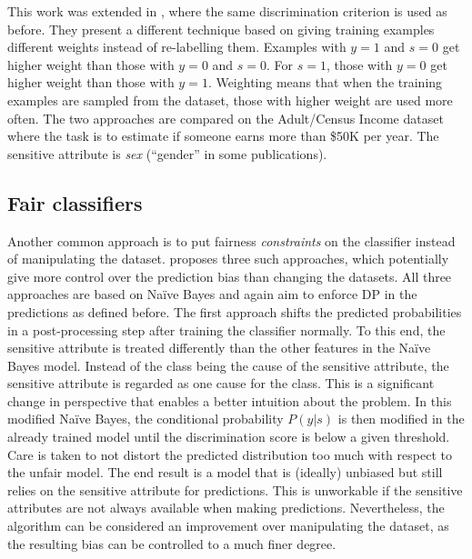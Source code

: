 This work was extended in \citet{calders2009building},
where the same discrimination criterion is used as before.
They present a different technique based on giving training examples different weights
instead of re-labelling them.
Examples with \(y=1\) and \(s=0\) get higher weight than those with \(y=0\) and \(s=0\).
For \(s=1\), those with \(y=0\) get higher weight than those with \(y=1\).
Weighting means that when the training examples are sampled from the dataset,
those with higher weight are used more often.
The two approaches are compared on the Adult/Census Income dataset \citep{kohavi1996scaling}
where the task is to estimate if someone earns more than \$50K per year.
The sensitive attribute is \emph{sex} (``gender'' in some publications).

\subsection{Fair classifiers}\label{fair-classifiers}
Another common approach is to put fairness \emph{constraints} on the classifier
instead of manipulating the dataset.
\citet{calders2010three} proposes three such approaches,
which potentially give more control over the prediction bias than changing the datasets.
All three approaches are based on Na\"ive Bayes
and again aim to enforce \ac{DP} in the predictions as defined before.
The first approach shifts the predicted probabilities in a post-processing step
after training the classifier normally.
To this end, the sensitive attribute is treated differently
than the other features in the Na\"ive Bayes model.
Instead of the class being the cause of the sensitive attribute,
the sensitive attribute is regarded as one cause for the class.
This is a significant change in perspective that enables a better intuition about the problem.
In this modified Na\"ive Bayes,
the conditional probability \(P(y|s)\) is then modified in the already trained model
until the discrimination score is below a given threshold.
Care is taken to not distort the predicted distribution too much with respect to the unfair model.
The end result is a model that is (ideally) unbiased
but still relies on the sensitive attribute for predictions.
This is unworkable if the sensitive attributes are not always available when making predictions.
Nevertheless, the algorithm can be considered an improvement over manipulating the dataset,
as the resulting bias can be controlled to a much finer degree.

